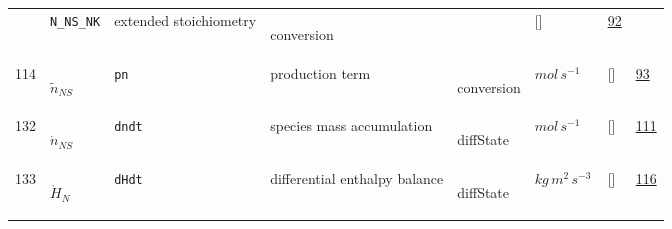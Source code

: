 \begin{longtable}{|p{1cm}|p{3cm}|p{3cm}|p{7cm}|p{3.0cm}|p{3cm}|p{2cm}|p{1cm}|}
             & \verb|N_NS_NK|
             & extended stoichiometry
             & \begin{lay}conversion \end{lay}
             & $  $
             & []
             & \hyperlink{"e:92"}{ 92 }
                 \\
    114
             & \hypertarget{"v:114"}{ $ {\tilde{n}}_{{N S}} $}
             & \verb|pn|
             & production term
             & \begin{lay}conversion \end{lay}
             & $ mol \,s^{-1} \, $
             & []
             & \hyperlink{"e:93"}{ 93 }
                 \\
    132
             & \hypertarget{"v:132"}{ $ {\dot{n}}_{{N S}} $}
             & \verb|dndt|
             & species mass accumulation
             & \begin{lay}diffState \end{lay}
             & $ mol \,s^{-1} \, $
             & []
             & \hyperlink{"e:111"}{ 111 }
                 \\
    133
             & \hypertarget{"v:133"}{ $ {\dot{H}}_{N} $}
             & \verb|dHdt|
             & differential enthalpy balance
             & \begin{lay}diffState \end{lay}
             & $ kg \,m^{2} \,s^{-3} \, $
             & []
             & \hyperlink{"e:116"}{ 116 }
                 \\
    \end{longtable}